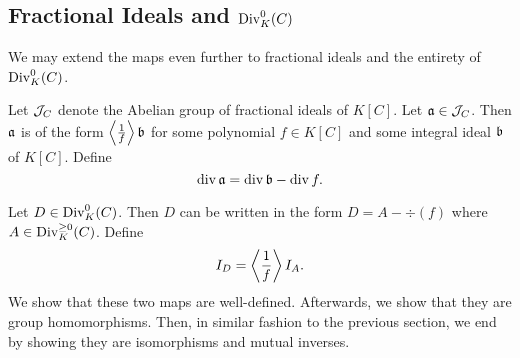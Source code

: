 \begin{comment}
\begin{proof}
  The proof is quite immediate after factoring each ideal.
  It has already been established that $\div$ maps the identity $K[C]$ of $\cal I_C$ to the identity $0$ of $\Div_K^0(C)$.
  Let $\frak a$ and $\frak b$ be non-zero ideals with prime factorizations
  \[ \frak a = \prod \frak p_i^{k_i}, ~~~ \frak b = \prod \frak q_i^{\ell_i}. \]
  Then
  \begin{align*}
    \div (\frak a \frak b)
      &= \div \left( \left( \prod \frak p_i^{k_i} \right) \left( \prod \frak q_j^{\ell_j} \right) \right) \\
      &= \sum k_i \div \frak p_i + \sum \ell_j \div \frak q_i \\
      &= \div \frak a + \div \frak b.
  \end{align*}
\end{proof}
\end{comment}




\subsection{Fractional Ideals and $\Div_K^0(C)$}

We may extend the maps even further to fractional ideals and the entirety of $\Div_K^0(C)$.

Let $\cal J_C$ denote the Abelian group of fractional ideals of $K[C]$.
Let $\frak a \in \cal J_C$.
Then $\frak a$ is of the form $\pid{\frac 1 f} \frak b$ for some polynomial $f \in K[C]$ and some integral ideal $\frak b$ of $K[C]$.
Define
\[ \div \frak a = \div \frak b - \div f. \]

Let $D \in \Div_K^0(C)$.
Then $D$ can be written in the form $D = A - \div(f)$ where $A \in \Div_K^{\geq 0}(C)$.
Define
\[ I_D = \pid{\frac 1 f} I_A. \]
We show that these two maps are well-defined.
Afterwards, we show that they are group homomorphisms.
Then, in similar fashion to the previous section, we end by showing they are isomorphisms and mutual inverses.


